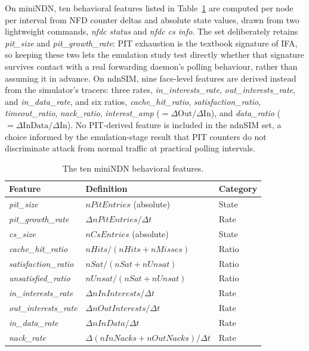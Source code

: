 On miniNDN, ten behavioral features listed in Table~\ref{tab:features} are computed per node per interval from NFD counter deltas and absolute state values, drawn from two lightweight commands, \textit{nfdc status} and \textit{nfdc cs info}. The set deliberately retains \textit{pit\_size} and \textit{pit\_growth\_rate}: PIT exhaustion is the textbook signature of IFA, so keeping these two lets the emulation study test directly whether that signature survives contact with a real forwarding daemon's polling behaviour, rather than assuming it in advance. On ndnSIM, nine face-level features are derived instead from the simulator's tracers: three rates, \textit{in\_interests\_rate}, \textit{out\_interests\_rate}, and \textit{in\_data\_rate}, and six ratios, \textit{cache\_hit\_ratio}, \textit{satisfaction\_ratio}, \textit{timeout\_ratio}, \textit{nack\_ratio}, \textit{interest\_amp} ($=\Delta\text{Out}/\Delta\text{In}$), and \textit{data\_ratio} ($=\Delta\text{InData}/\Delta\text{In}$). No PIT-derived feature is included in the ndnSIM set, a choice informed by the emulation-stage result that PIT counters do not discriminate attack from normal traffic at practical polling intervals.

\begin{table}[t]
\centering
\caption{The ten miniNDN behavioral features.}
\label{tab:features}
\begin{tabular}{@{}lll@{}}
\toprule
\textbf{Feature}              & \textbf{Definition}                                                       & \textbf{Category} \\
\midrule
\textit{pit\_size}            & $\textit{nPitEntries}$ (absolute)                                         & State \\
\textit{pit\_growth\_rate}    & $\Delta\textit{nPitEntries} / \Delta t$                                   & Rate  \\
\textit{cs\_size}             & $\textit{nCsEntries}$ (absolute)                                          & State \\
\textit{cache\_hit\_ratio}    & $\textit{nHits} / (\textit{nHits} + \textit{nMisses})$                    & Ratio \\
\textit{satisfaction\_ratio}  & $\textit{nSat} / (\textit{nSat} + \textit{nUnsat})$                       & Ratio \\
\textit{unsatisfied\_ratio}   & $\textit{nUnsat} / (\textit{nSat} + \textit{nUnsat})$                     & Ratio \\
\textit{in\_interests\_rate}  & $\Delta\textit{nInInterests} / \Delta t$                                  & Rate  \\
\textit{out\_interests\_rate} & $\Delta\textit{nOutInterests} / \Delta t$                                 & Rate  \\
\textit{in\_data\_rate}       & $\Delta\textit{nInData} / \Delta t$                                       & Rate  \\
\textit{nack\_rate}           & $\Delta(\textit{nInNacks} + \textit{nOutNacks}) / \Delta t$               & Rate  \\
\bottomrule
\end{tabular}
\end{table}


